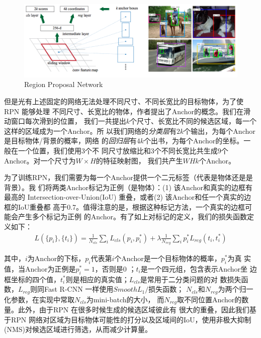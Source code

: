 \begin{figure}[ht]
  \centering
  \includegraphics[width=1.0\linewidth]{./Figure/RPN.png}
  \caption{Region Proposal Network\cite{Ren:2015ug}}\label{Fig:RPN}
\end{figure}

但是光有上述固定的网络无法处理不同尺寸、不同长宽比的目标物体，为了使RPN 能够处理
不同尺寸、长宽比的物体，作者提出了Anchor的概念。我们在滑动窗口每次滑到的位置，
我们一共提出$k$个尺寸、长宽比不同的候选区域，每一个这样的区域成为一个Anchor。所
以我们网络的\textit{分类层}有$2k$个输出，为每个Anchor是目标物体/背景的概率，网络
的\textit{回归层}有$4k$个出书，为每个Anchor的坐标。一般在一个位置，我们使用3个不
同尺寸放缩比和3个不同长宽比共生成9个Anchor。对一个尺寸为$W \times H$的特征映射图，
我们共产生$WHk$个Anchor。

为了训练RPN，我们需要为每一个Anchor提供一个二元标签（代表是物体还是是背景）。我
们将两类Anchor标记为正例（是物体）：(1) 该Anchor和真实的边框有最高的
Intersection-over-Union(IoU) 重叠，或者(2) 该Anchor和任一个真实的边框的IoU重叠都
高于0.7。值得注意的是，根据这种标记方法，一个真实的边框可能会产生多个标记为正例
的Anchor。有了如上对标记的定义，我们的损失函数定义如下：
\begin{equation}
\begin{aligned}
L(\{p_i\}, \{t_i\}) = \frac{1}{N_{cls}}\sum_i{L_{cls}(p_i, p_i^*)} + \lambda\frac{1}{N_{reg}}\sum_i{p_i^*L_{reg}(t_i,t_i^*)}
\end{aligned}
\end{equation}

其中，$i$为Anchor的下标，$p_i$代表第$i$个Anchor是一个目标物体的概率，$p_i^*$为真
实值，当Anchor为正例是$p_i^* = 1$，否则是0 ；$t_i$是一个四元组，包含表示Anchor坐
边框坐标的四个值，$t_i^*$则是相应的真实值；$L_{cls}$是常用于二分类问题的对
数损失函数，$L_{reg}$则同Fast R-CNN 一样使用$Smooth L_1/$损失函数；
$N_{cls}$和$N_{reg}$为两个归一化参数，在实现中常取$N_{cls}$为mini-batch的大小，
而$N_{reg}$取不同位置Anchor的数量。此外，由于RPN 在很多时候生成的候选区域彼此有
很大的重叠，因此我们基于RPN 网络对区域为目标物体可能性的打分以及区域间的IoU，使用非极大抑制
(NMS)对候选区域进行筛选，从而减少计算量。

